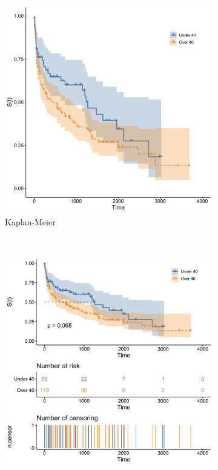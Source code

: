 \begin{figure}[H]
\centering
  \begin{subfigure}[c]{0.48\textwidth}\centering
  \includegraphics[width=\textwidth]{figures/survival/stanford_km}
  \caption{Kaplan-Meier}
  \label{fig:stanford_km:km}
  \end{subfigure}
  ~
  \begin{subfigure}[c]{0.48\textwidth}\centering
  \includegraphics[width=\textwidth]{figures/survival/stanford_km_annotated}

\end{subfigure}
\end{figure}
